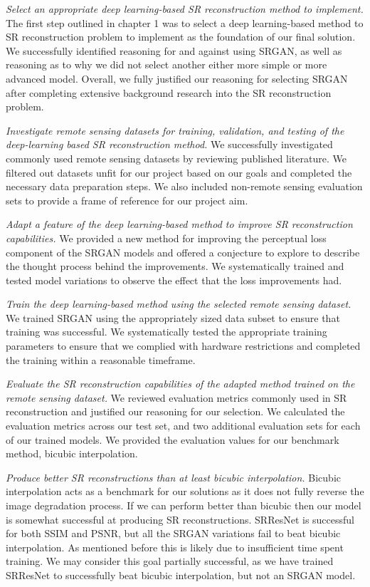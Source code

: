 \textit{Select an appropriate deep learning-based SR reconstruction method to implement.} The first step outlined in chapter 1 was to select a deep learning-based method to SR reconstruction problem to implement as the foundation of our final solution. We successfully identified reasoning for and against using SRGAN, as well as reasoning as to why we did not select another either more simple or more advanced model. Overall, we fully justified our reasoning for selecting SRGAN after completing extensive background research into the SR reconstruction problem.

\textit{Investigate remote sensing datasets for training, validation, and testing of the deep-learning based SR reconstruction method.} We successfully investigated commonly used remote sensing datasets by reviewing published literature. We filtered out datasets unfit for our project based on our goals and completed the necessary data preparation steps. We also included non-remote sensing evaluation sets to provide a frame of reference for our project aim. 

\textit{Adapt a feature of the deep learning-based method to improve SR reconstruction capabilities.} We provided a new method for improving the perceptual loss component of the SRGAN models and offered a conjecture to explore to describe the thought process behind the improvements. We systematically trained and tested model variations to observe the effect that the loss improvements had.

\textit{Train the deep learning-based method using the selected remote sensing dataset.} We trained SRGAN using the appropriately sized data subset to ensure that training was successful. We systematically tested the appropriate training parameters to ensure that we complied with hardware restrictions and completed the training within a reasonable timeframe.

\textit{Evaluate the SR reconstruction capabilities of the adapted method trained on the remote sensing dataset.} We reviewed evaluation metrics commonly used in SR reconstruction and justified our reasoning for our selection. We calculated the evaluation metrics across our test set, and two additional evaluation sets for each of our trained models. We provided the evaluation values for our benchmark method, bicubic interpolation.

\textit{Produce better SR reconstructions than at least bicubic interpolation.} Bicubic interpolation acts as a benchmark for our solutions as it does not fully reverse the image degradation process. If we can perform better than bicubic then our model is somewhat successful at producing SR reconstructions. SRResNet is successful for both SSIM and PSNR, but all the SRGAN variations fail to beat bicubic interpolation. As mentioned before this is likely due to insufficient time spent training. We may consider this goal partially successful, as we have trained SRResNet to successfully beat bicubic interpolation, but not an SRGAN model.

